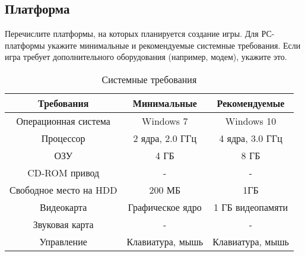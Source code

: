 \documentclass[a4paper,12pt]{article}
\begin{document}
\subsection{Платформа}
Перечислите платформы, на которых планируется создание игры. Для РС-платформы укажите минимальные и рекомендуемые системные требования. Если игра требует дополнительного оборудования (например, модем), укажите это.  
\begin{table}[h!]
\centering
\begin{tabular}{|c|c|c|}
\hline

Требования & \textbf{Минимальные} & \textbf{Рекомендуемые} \\ \hline
Операционная система & Windows 7 & Windows 10\\ \hline
Процессор& 2 ядра, 2.0 ГГц & 4 ядра, 3.0 ГГц\\ \hline
ОЗУ& 4 ГБ& 8 ГБ\\ \hline
CD-ROM привод & - & - \\ \hline
Свободное место на HDD&200 МБ & 1ГБ\\ \hline
Видеокарта & Графическое ядро & 1 ГБ видеопамяти \\ \hline
Звуковая карта& - & - \\ \hline
Управление& Клавиатура, мышь & Клавиатура, мышь\\ \hline
\end{tabular}

\caption{Системные требования}
\label{tab:example_table}
\end{table}
\end{document}
